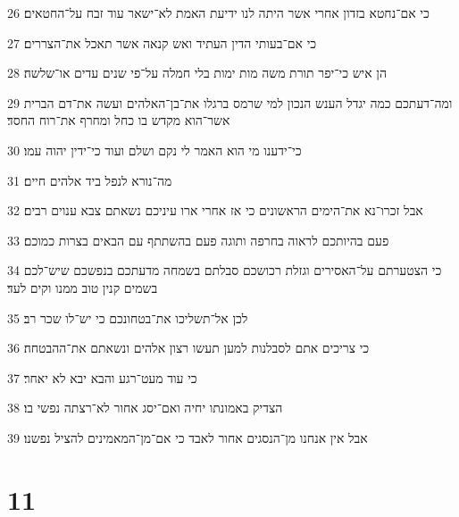 \par 26 כי אם־נחטא בזדון אחרי אשר היתה לנו ידיעת האמת לא־ישאר עוד זבח על־החטאים׃
\par 27 כי אם־בעותי הדין העתיד ואש קנאה אשר תאכל את־הצררים׃
\par 28 הן איש כי־יפר תורת משה מות ימות בלי חמלה על־פי שנים עדים או־שלשה׃
\par 29 ומה־דעתכם כמה יגדל הענש הנכון למי שרמס ברגלו את־בן־האלהים ועשה את־דם הברית אשר־הוא מקדש בו כחל ומחרף את־רוח החסד׃
\par 30 כי־ידענו מי הוא האמר לי נקם ושלם ועוד כי־ידין יהוה עמו׃
\par 31 מה־נורא לנפל ביד אלהים חיים׃
\par 32 אבל זכרו־נא את־הימים הראשונים כי אז אחרי ארו עיניכם נשאתם צבא ענוים רבים׃
\par 33 פעם בהיותכם לראוה בחרפה ותוגה פעם בהשתתף עם הבאים בצרות כמוכם׃
\par 34 כי הצטערתם על־האסירים וגזלת רכושכם סבלתם בשמחה מדעתכם בנפשכם שיש־לכם בשמים קנין טוב ממנו וקים לעד׃
\par 35 לכן אל־תשליכו את־בטחונכם כי יש־לו שכר רב׃
\par 36 כי צריכים אתם לסבלנות למען תעשו רצון אלהים ונשאתם את־ההבטחה׃
\par 37 כי עוד מעט־רגע והבא יבא לא יאחר׃
\par 38 הצדיק באמונתו יחיה ואם־יסג אחור לא־רצתה נפשי בו׃
\par 39 אבל אין אנחנו מן־הנסגים אחור לאבד כי אם־מן־המאמינים להציל נפשנו׃

\chapter{11}

